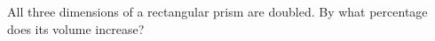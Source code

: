 All three dimensions of a rectangular prism are doubled. By what percentage does its volume increase?
